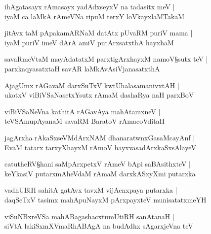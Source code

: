 \begin{shloka}
ihAgatasayx rAmasayx yadAdxseyxV na tadasitx meV |\\
iyaM ca laMkA rAmeVNa ripuM terxY loVkayxlaMTakaM 
\end{shloka}

\begin{shloka}
jitAvx taM pApakamARNaM datAtx pUvaRM puriV mama |\\
iyaM puriV imeV dArA amiV putArxsatxthA hayxhaM 
\end{shloka}

\begin{shloka}
savaRmeVtaM mayAdatatxM parxtigArxhayxM namoV\S sutx teV |\\
parxkaqyasatxtaH savAR laMkAvAsiVjanasatxthA 
\end{shloka}

\begin{shloka}
AjagUmx rAGavaM darxSuTxV kwtUhalasamanivxtAH |\\
ukotxV viBiVSaNasetxYsutx rAmaM dashaRya naH parxBoV
\end{shloka}

\begin{shloka}
viBiVSaNeVna kathitA rAGavAya mahAtamxneV |\\
teVSAmupAyanaM savaRM BaratoV rAmacoVditaH 
\end{shloka}

\begin{shloka}
jagArxha rAkaSxseVMdArxNAM dhanaratwnxGasaMcayAnf |\\
EvaM tatarx tarxyXhayxM rAmoV hayxvasadArxkaSxsAlayeV 
\end{shloka}

\begin{shloka}
catutheRV\S hani saMpArxpetxV rAmeV bApi saBAsithxteV |\\
keYkasiV putarxmAheVdaM rAmaM darxkASxyXmi putarxka
\end{shloka}

\begin{shloka}
vadhUBiH  sahitA gatAvx tavxM vijAcnxpaya putarxka |\\
daqSeTxV tasimx\R{} mahApuNayxM pArxpayxteV munisatatxmeYH 
\end{shloka}

\begin{shloka}
viSuNBxreVSa mahABagashacxtumUtiRH sanAtanaH |\\
siVtA lakiSxmXVmaRhABAgA na budAdhx sAgarxjeVna teV 
\end{shloka}

